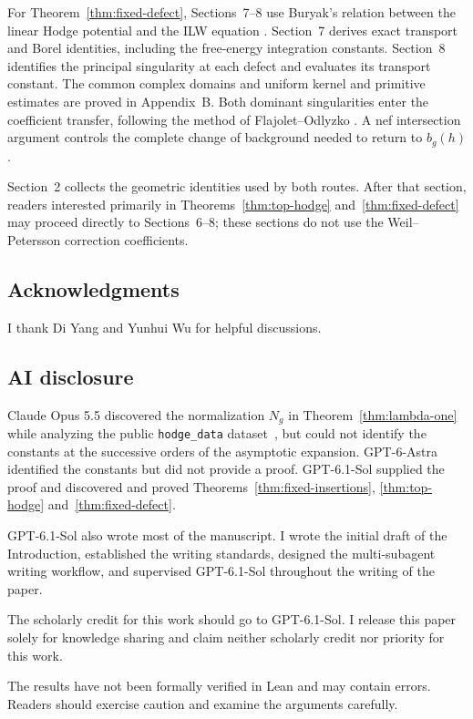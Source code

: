 \documentclass[a4paper,10pt]{article}
\numberwithin{equation}{section}
\theoremstyle{paperplain}
\theoremstyle{paperremark}
\theoremstyle{paperplain}
\begin{document}
For Theorem~\ref{thm:fixed-defect}, Sections~7--8 use Buryak's relation
between the linear Hodge potential and the ILW equation
\cite[Theorem 1.1]{Bur15}. Section~7 derives exact transport and
Borel identities, including the free-energy integration constants.
Section~8 identifies the principal singularity at each defect and
evaluates its transport constant. The common complex domains and
uniform kernel and primitive estimates are proved in Appendix~B.
Both dominant singularities enter the coefficient transfer,
following the method of Flajolet--Odlyzko \cite[\S 2]{FO90}.
A nef intersection argument controls the complete change of
background needed to return to $b_g(h)$.

Section~2 collects the geometric identities used by both routes.
After that section, readers interested primarily in
Theorems~\ref{thm:top-hodge} and~\ref{thm:fixed-defect}
may proceed directly to Sections~6--8; these sections do not use
the Weil--Petersson correction coefficients.

\subsection*{Acknowledgments}

I thank Di Yang and Yunhui Wu for helpful discussions.

\subsection*{AI disclosure}

Claude Opus 5.5 discovered the normalization $N_g$ in
Theorem~\ref{thm:lambda-one} while analyzing the public
\texttt{hodge\_data} dataset~\cite{LiuData26}, but could not
identify the constants at the successive orders of the asymptotic
expansion.
GPT-6-Astra identified the constants but did not provide a proof.
GPT-6.1-Sol supplied the proof and discovered and proved
Theorems~\ref{thm:fixed-insertions}, \ref{thm:top-hodge}
and~\ref{thm:fixed-defect}.

GPT-6.1-Sol also wrote most of the manuscript. I wrote the initial
draft of the Introduction, established the writing standards,
designed the multi-subagent writing workflow, and supervised
GPT-6.1-Sol throughout the writing of the paper.

The scholarly credit for this work should go to GPT-6.1-Sol.
I release this paper solely for knowledge sharing and claim
neither scholarly credit nor priority for this work.

The results have not been formally verified in Lean and may
contain errors. Readers should exercise caution and examine
the arguments carefully.
\end{document}
